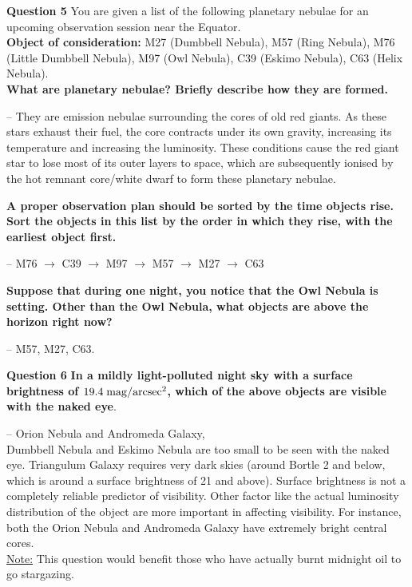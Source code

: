 \documentclass[a4paper,12pt]{extarticle}
\begin{document}
\textsf{\textbf{Question 5}} You are given a list of the following planetary nebulae for an upcoming observation session near the Equator. \\

\textbf{Object of consideration:} M27 (Dumbbell Nebula), M57 (Ring Nebula), M76 (Little Dumbbell Nebula), M97 (Owl Nebula), C39 (Eskimo Nebula), C63 (Helix Nebula).\\

\textbf{What are planetary nebulae? Briefly describe how they are formed.}
\begin{sol}
-- They are emission nebulae surrounding the cores of old red giants. As these stars exhaust their fuel, the core contracts under its own gravity, increasing its temperature and
increasing the luminosity. These conditions cause the red giant star to lose most of its outer layers to space, which are subsequently ionised by the hot remnant core/white dwarf to form these planetary nebulae.	
\end{sol}

\textbf{A proper observation plan should be sorted by the time objects rise. Sort the objects in this list by the order in which they rise, with the earliest object first.}
\begin{sol}
-- M76 $\rightarrow$ C39 $\rightarrow$ M97 $\rightarrow$ M57 $\rightarrow$ M27 $\rightarrow$ C63	
\end{sol}

\textbf{Suppose that during one night, you notice that the Owl Nebula is
setting. Other than the Owl Nebula, what objects are above the
horizon right now?}
\begin{sol}
-- M57, M27, C63.	
\end{sol}

\textsf{\textbf{Question 6}} \textbf{In a mildly light-polluted night sky with a surface brightness of $19.4\; \rm mag/arcsec^2$, which of the above objects are visible with the naked eye}.
\begin{sol}
	-- Orion Nebula and Andromeda Galaxy,\\
	
	Dumbbell Nebula and Eskimo Nebula are too small to be seen with the naked eye. Triangulum Galaxy requires very dark skies (around Bortle 2 and below, which is around a surface brightness of 21 and above). Surface brightness is not a completely reliable predictor of visibility. Other factor like the actual luminosity distribution of the object are more important in affecting visibility. For instance, both the Orion Nebula and Andromeda Galaxy have extremely bright central cores.\\
	
	\underline{Note:} This question would benefit those who have actually burnt midnight oil to go stargazing.
\end{sol}
\end{document}
